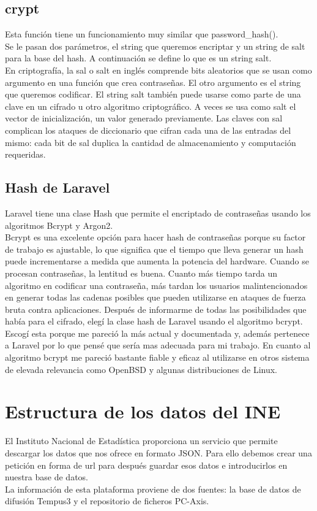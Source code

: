 \subsection{crypt}
Esta función tiene un funcionamiento muy similar que password\_hash().\\
Se le pasan dos parámetros, el string que queremos encriptar y un string de salt para la base del hash.\cite{crypt} A continuación se define lo que es un string salt.\\
En criptografía, la sal o salt en inglés comprende bits aleatorios que se usan como argumento en una función que crea contraseñas. El otro argumento es el string que queremos codificar. El string salt también puede usarse como parte de una clave en un cifrado u otro algoritmo criptográfico. A veces se usa como salt el vector de inicialización, un valor generado previamente.
Las claves con sal complican los ataques de diccionario que cifran cada una de las entradas del mismo: cada bit de sal duplica la cantidad de almacenamiento y computación requeridas.\cite{salt}
\subsection{Hash de Laravel}
Laravel tiene una clase Hash que permite el encriptado de contraseñas usando los algoritmos Bcrypt y Argon2.\\
Bcrypt es una excelente opción para hacer hash de contraseñas porque su factor de trabajo es ajustable, lo que significa que el tiempo que lleva generar un hash puede incrementarse a medida que aumenta la potencia del hardware. Cuando se procesan contraseñas, la lentitud es buena. Cuanto más tiempo tarda un algoritmo en codificar una contraseña, más tardan los usuarios malintencionados en generar todas las cadenas posibles que pueden utilizarse en ataques de fuerza bruta contra aplicaciones.\cite{HashLaravel}
Después de informarme de todas las posibilidades que había para el cifrado, elegí la clase hash de Laravel usando el algoritmo bcrypt.\\
Escogí esta porque me pareció la más actual y documentada y, además pertenece a Laravel por lo que pensé que sería mas adecuada para mi trabajo. En cuanto al algoritmo bcrypt me pareció bastante fiable y eficaz al utilizarse en otros sistema de elevada relevancia como OpenBSD y algunas distribuciones de Linux.
 \section{Estructura de los datos del INE}
El Instituto Nacional de Estadística proporciona un servicio que permite descargar los datos que nos ofrece en formato JSON. Para ello debemos crear una petición en forma de url para después guardar esos datos e introducirlos en nuestra base de datos.\\
La información de esta plataforma proviene de dos fuentes: la base de datos de difusión Tempus3 y el repositorio de ficheros PC-Axis.\\
